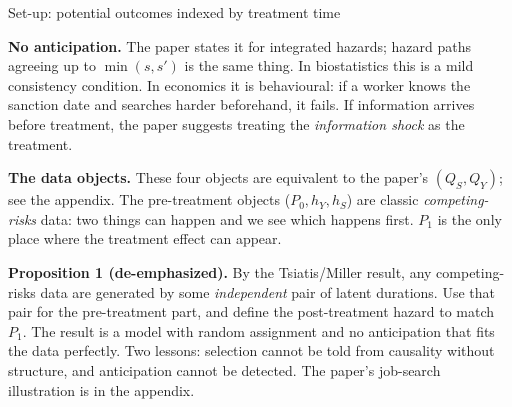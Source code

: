 \documentclass[aspectratio=169,10pt]{beamer}
\newcommand{\1}{\mathbf{1}}
\begin{document}
\begin{frame}{Set-up: potential outcomes indexed by treatment time}
{\textbf{No anticipation.} The paper states it for integrated hazards; hazard paths agreeing up to $\min(s,s')$ is the same thing. In biostatistics this is a mild consistency condition. In economics it is behavioural: if a worker knows the sanction date and searches harder beforehand, it fails. If information arrives before treatment, the paper suggests treating the \emph{information shock} as the treatment.

\textbf{The data objects.} These four objects are equivalent to the paper's $(Q_S,Q_Y)$; see the appendix. The pre-treatment objects ($P_0,h_Y,h_S$) are classic \emph{competing-risks} data: two things can happen and we see which happens first. $P_1$ is the only place where the treatment effect can appear.

\textbf{Proposition 1 (de-emphasized).} By the Tsiatis/Miller result, any competing-risks data are generated by some \emph{independent} pair of latent durations. Use that pair for the pre-treatment part, and define the post-treatment hazard to match $P_1$. The result is a model with random assignment and no anticipation that fits the data perfectly. Two lessons: selection cannot be told from causality without structure, and anticipation cannot be detected. The paper's job-search illustration is in the appendix.
}
\end{frame}
\end{document}
